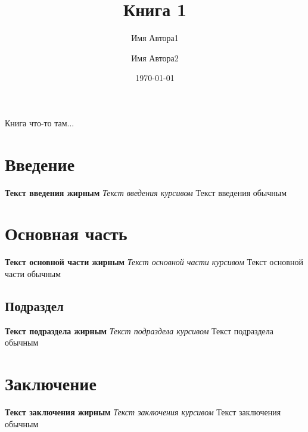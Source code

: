 \documentclass[14pt]{book}
\title{Книга 1}
\author{Имя Автора1 \and Имя Автора2}
\date{\today}
\begin{document}
\maketitle

\begin{center}
    {\huge Книга что-то там...}
\end{center}
\thispagestyle{empty}

\hfill \break
\renewcommand{\contentsname}{Содержание}
\tableofcontents
\thispagestyle{empty}

\newpage
\section{Введение}
\tiny{\textbf{Текст введения жирным} \textit{Текст введения курсивом} Текст введения обычным}

\section{Основная часть}
\large{\textbf{Текст основной части жирным} \textit{Текст основной части курсивом} Текст основной части обычным}

\subsection{Подраздел}
\large{\textbf{Текст подраздела жирным} \textit{Текст подраздела курсивом} Текст подраздела обычным}

\section{Заключение}
\huge{\textbf{Текст заключения жирным} \textit{Текст заключения курсивом} Текст заключения обычным}
\end{document}
